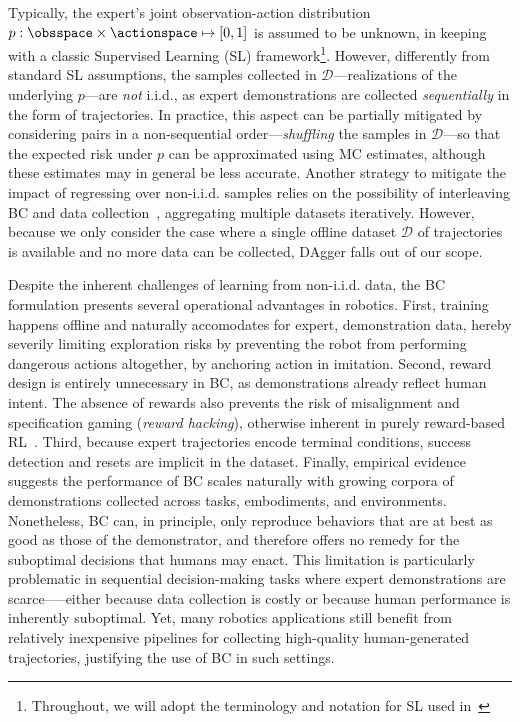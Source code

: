 Typically, the expert's joint observation-action distribution \( p: \obsspace \times \actionspace \mapsto [0,1] \) is assumed to be unknown, in keeping with a classic Supervised Learning (SL) framework\footnote{Throughout, we will adopt the terminology and notation for SL used in~\citet{shalev-shwartzUnderstandingMachineLearning2014}}.
However, differently from standard SL assumptions, the samples collected in \( \mathcal D \)---realizations of the underlying \( p \)---are \emph{not} i.i.d., as expert demonstrations are collected \emph{sequentially} in the form of trajectories.
In practice, this aspect can be partially mitigated by considering pairs in a non-sequential order---\emph{shuffling} the samples in \(\mathcal D \)---so that the expected risk under \( p \) can be approximated using MC estimates, although these estimates may in general be less accurate.
Another strategy to mitigate the impact of regressing over non-i.i.d. samples relies on the possibility of interleaving BC and data collection~\citep[DAgger]{rossReductionImitationLearning2011}, aggregating multiple datasets iteratively.
However, because we only consider the case where a single offline dataset \( \mathcal D \) of trajectories is available and no more data can be collected, DAgger falls out of our scope.

Despite the inherent challenges of learning from non-i.i.d. data, the BC formulation presents several operational advantages in robotics.
First, training happens offline and naturally accomodates for expert, demonstration data, hereby severily limiting exploration risks by preventing the robot from performing dangerous actions altogether, by anchoring action in imitation.
Second, reward design is entirely unnecessary in BC, as demonstrations already reflect human intent.
The absence of rewards also prevents the risk of misalignment and specification gaming (\emph{reward hacking}), otherwise inherent in purely reward-based RL~\citep{heessEmergenceLocomotionBehaviours2017}.
Third, because expert trajectories encode terminal conditions, success detection and resets are implicit in the dataset.
Finally, empirical evidence suggests the performance of BC scales naturally with growing corpora of demonstrations collected across tasks, embodiments, and environments.
Nonetheless, BC can, in principle, only reproduce behaviors that are at best as good as those of the demonstrator, and therefore offers no remedy for the suboptimal decisions that humans may enact.
This limitation is particularly problematic in sequential decision-making tasks where expert demonstrations are scarce--—either because data collection is costly or because human performance is inherently suboptimal. 
Yet, many robotics applications still benefit from relatively inexpensive pipelines for collecting high-quality human-generated trajectories, justifying the use of BC in such settings.

